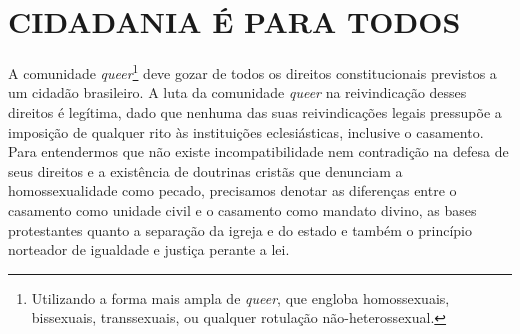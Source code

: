 \documentclass[
    article,            %
	12pt,				%
	oneside,			%
	a4paper,			%
	chapter=TITLE,		%
	section=TITLE,		%
	english,			%
	french,				%
	spanish,			%
	brazil				%
	]{abntex2}
\begin{document}



\imprimircapa

\imprimirfolhaderosto


\textual
\pagestyle{simple}


\section*{CIDADANIA É PARA TODOS}

A comunidade \emph{queer}\footnote{Utilizando a forma mais ampla de \emph{queer}, que engloba homossexuais, bissexuais, transsexuais, ou qualquer rotulação não-heterossexual.} deve gozar de todos os direitos constitucionais previstos a um cidadão brasileiro. A luta da comunidade \emph{queer} na reivindicação desses direitos é legítima, dado que nenhuma das suas reivindicações legais pressupõe a imposição de qualquer rito às instituições eclesiásticas, inclusive o casamento. Para entendermos que não existe incompatibilidade nem contradição na defesa de seus direitos e a existência de doutrinas cristãs que denunciam a homossexualidade como pecado, precisamos denotar as diferenças entre o casamento como unidade civil e o casamento como mandato divino, as bases protestantes quanto a separação da igreja e do estado e também o princípio norteador de igualdade e justiça perante a lei.
\end{document}
